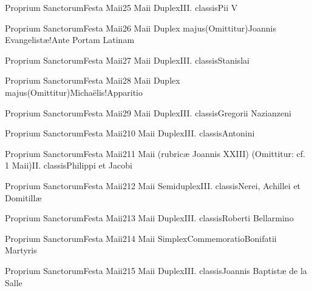 \documentclass[invitatoriale-romanum.tex]{subfiles}
\begin{document}
	{Proprium Sanctorum}{Festa Maii}{2}{5 Maii}
	{Duplex}{III. classis}{Pii V}
	{}
	{}

	{Proprium Sanctorum}{Festa Maii}{2}{6 Maii}
	{Duplex majus}{(Omittitur)}{Joannis Evangelistæ!Ante Portam Latinam}
	{}
	{\invitferia}

	{Proprium Sanctorum}{Festa Maii}{2}{7 Maii}
	{Duplex}{III. classis}{Stanislai}
	{}
	{}

\newpage

	{Proprium Sanctorum}{Festa Maii}{2}{8 Maii}
	{Duplex majus}{(Omittitur)}{Michaëlis!Apparitio}
	{}
	{\invitferia}

	{Proprium Sanctorum}{Festa Maii}{2}{9 Maii}
	{Duplex}{III. classis}{Gregorii Nazianzeni}
	{}
	{}

	{Proprium Sanctorum}{Festa Maii}{2}{10 Maii}
	{Duplex}{III. classis}{Antonini}
	{}
	{}

	{Proprium Sanctorum}{Festa Maii}{2}{11 Maii (rubricæ Joannis XXIII)}
	{(Omittitur: cf. 1 Maii)}{II. classis}{Philippi et Jacobi}
	{\invitferia}
	{}

	{Proprium Sanctorum}{Festa Maii}{2}{12 Maii}
	{Semiduplex}{III. classis}{Nerei, Achillei et Domitillæ}
	{}
	{}

	{Proprium Sanctorum}{Festa Maii}{2}{13 Maii}
	{Duplex}{III. classis}{Roberti Bellarmino}
	{}
	{}

	{Proprium Sanctorum}{Festa Maii}{2}{14 Maii}
	{Simplex}{Commemoratio}{Bonifatii Martyris}
	{}
	{\invitferia}

	{Proprium Sanctorum}{Festa Maii}{2}{15 Maii}
	{Duplex}{III. classis}{Joannis Baptistæ de la Salle}
	{}
	{}
\end{document}
